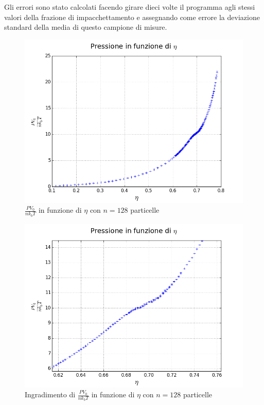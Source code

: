 Gli errori sono stato calcolati facendo girare dieci volte il programma agli stessi valori della frazione di impacchettamento e assegnando come errore la deviazione standard della media di questo campione di misure.

\begin{figure}[h!]
	\centering
	\includegraphics[scale=0.48]{sfere2D/pression.png}
	\caption{ $\frac{P V_0}{n k_{b} T}$ in funzione di $\eta$ con $n=128$ particelle}
	\end{figure}

\begin{figure}[h!]
	\centering
	\includegraphics[scale=0.48]{sfere2D/pressionzoom.png}
	\caption{Ingradimento di $\frac{P V_0}{n k_{b} T}$ in funzione di $\eta$ con $n=128$ particelle}
	\end{figure}

